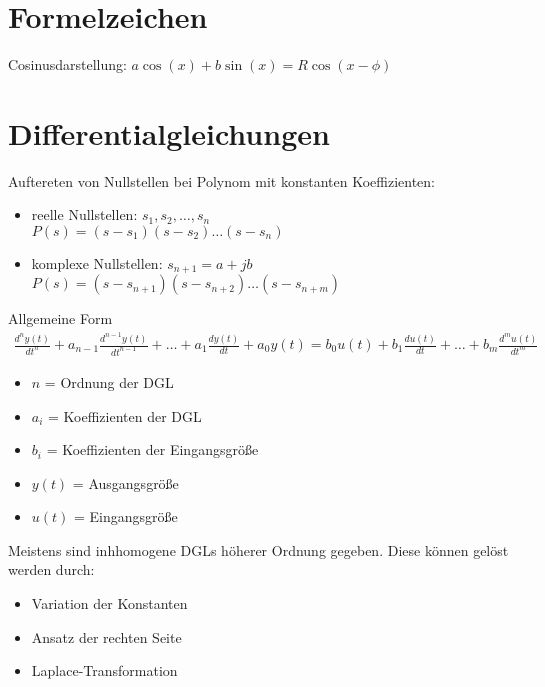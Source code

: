 \documentclass[german]{latex4ei/latex4ei_sheet}
\begin{document}
\section{Formelzeichen}

Cosinusdarstellung:
    $a \cos(x) + b \sin(x) = R \cos(x - \phi)$

\section{Differentialgleichungen}
  


Auftereten von Nullstellen bei Polynom mit konstanten Koeffizienten:
\begin{itemize}
    \item reelle Nullstellen: $s_1, s_2, \ldots, s_n$ \\
    $P(s) = (s - s_1)(s - s_2) \ldots (s - s_n)$
    \item komplexe Nullstellen: $s_{n+1} = a + jb$ \\
    $P(s) = (s - s_{n+1})(s - s_{n+2}) \ldots (s - s_{n+m})$
\end{itemize}



\begin{sectionbox}{Allgemeine Form}
    \begin{align*}
        \frac{d^n y(t)}{dt^n} + a_{n-1} \frac{d^{n-1} y(t)}{dt^{n-1}} + \ldots + a_1 \frac{dy(t)}{dt} + a_0 y(t) = b_0 u(t) + b_1 \frac{du(t)}{dt} + \ldots + b_m \frac{d^m u(t)}{dt^m}
    \end{align*}
    \begin{itemize}
        \item $n$ = Ordnung der DGL
        \item $a_i$ = Koeffizienten der DGL
        \item $b_i$ = Koeffizienten der Eingangsgröße
        \item $y(t)$ = Ausgangsgröße
        \item $u(t)$ = Eingangsgröße

\end{itemize}

Meistens sind inhhomogene DGLs höherer Ordnung gegeben.
Diese können gelöst werden durch:
\begin{itemize}
    \item Variation der Konstanten
    \item Ansatz der rechten Seite
    \item Laplace-Transformation
\end{itemize}
\end{sectionbox}
\end{document}
